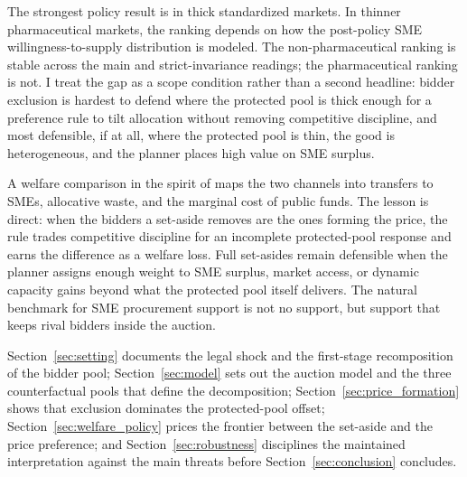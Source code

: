 The strongest policy result is in thick standardized markets. In thinner
pharmaceutical markets, the ranking depends on how the post-policy SME
willingness-to-supply distribution is modeled. The non-pharmaceutical
ranking is stable across the main and strict-invariance readings; the
pharmaceutical ranking is not. I treat the gap as a scope condition rather
than a second headline: bidder exclusion is hardest to defend where the
protected pool is thick enough for a preference rule to tilt allocation
without removing competitive discipline, and most defensible, if at all,
where the protected pool is thin, the good is heterogeneous, and the
planner places high value on SME surplus.

A welfare comparison in the spirit of \citet{saezstantcheva2016} maps the
two channels into transfers to SMEs, allocative waste, and the marginal cost
of public funds. The lesson is direct: when the bidders a set-aside
removes are the ones forming the price, the rule trades competitive
discipline for an incomplete protected-pool response and earns the
difference as a welfare loss. Full set-asides remain defensible when the
planner assigns enough weight to SME surplus, market access, or dynamic
capacity gains beyond what the protected pool itself delivers. The natural
benchmark for SME procurement support is not no support, but support that
keeps rival bidders inside the auction.

Section~\ref{sec:setting} documents the legal shock and the first-stage
recomposition of the bidder pool; Section~\ref{sec:model} sets out the
auction model and the three counterfactual pools that define the
decomposition; Section~\ref{sec:price_formation} shows that exclusion
dominates the protected-pool offset; Section~\ref{sec:welfare_policy}
prices the frontier between the set-aside and the price preference; and
Section~\ref{sec:robustness} disciplines the maintained interpretation
against the main threats before Section~\ref{sec:conclusion} concludes.
